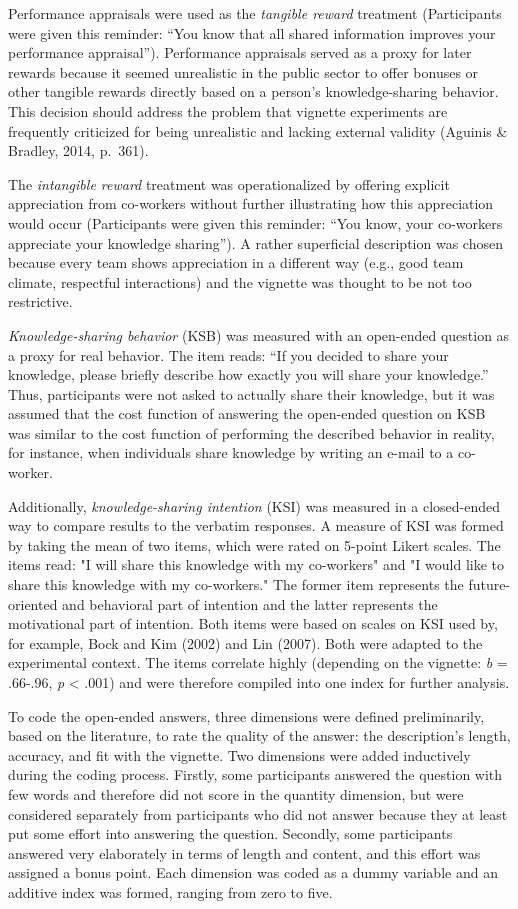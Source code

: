 \documentclass{article}
\begin{document}
Performance appraisals were used as the \emph{tangible reward }treatment (Participants were given this reminder: “You know that all shared information improves your performance appraisal”). Performance appraisals served as a proxy for later rewards because it seemed unrealistic in the public sector to offer bonuses or other tangible rewards directly based on a person's knowledge-sharing behavior. This decision should address the problem that vignette experiments are frequently criticized for being unrealistic and lacking external validity (Aguinis \& Bradley, 2014, p. 361).

The \emph{intangible reward} treatment was operationalized by offering explicit appreciation from co-workers without further illustrating how this appreciation would occur (Participants were given this reminder: “You know, your co-workers appreciate your knowledge sharing”). A rather superficial description was chosen because every team shows appreciation in a different way (e.g., good team climate, respectful interactions) and the vignette was thought to be not too restrictive.

\emph{Knowledge-sharing behavior} (KSB) was measured with an open-ended question as a proxy for real behavior. The item reads: “If you decided to share your knowledge, please briefly describe how exactly you will share your knowledge.” Thus, participants were not asked to actually share their knowledge, but it was assumed that the cost function of answering the open-ended question on KSB was similar to the cost function of performing the described behavior in reality, for instance, when individuals share knowledge by writing an e-mail to a co-worker. 

Additionally, \emph{knowledge-sharing intention} (KSI) was measured in a closed-ended way to compare results to the verbatim responses. A measure of KSI was formed by taking the mean of two items, which were rated on 5-point Likert scales. The items read: "I will share this knowledge with my co-workers" and "I would like to share this knowledge with my co-workers." The former item represents the future-oriented and behavioral part of intention and the latter represents the motivational part of intention. Both items were based on scales on KSI used by, for example, Bock and Kim (2002) and Lin (2007). Both were adapted to the experimental context. The items correlate highly (depending on the vignette: \emph{b }= .66-.96, \emph{p} < .001) and were therefore compiled into one index for further analysis. 

To code the open-ended answers, three dimensions were defined preliminarily, based on the literature, to rate the quality of the answer: the description's length, accuracy, and fit with the vignette. Two dimensions were added inductively during the coding process. Firstly, some participants answered the question with few words and therefore did not score in the quantity dimension, but were considered separately from participants who did not answer because they at least put some effort into answering the question. Secondly, some participants answered very elaborately in terms of length and content, and this effort was assigned a bonus point. Each dimension was coded as a dummy variable and an additive index was formed, ranging from zero to five. 
\end{document}
